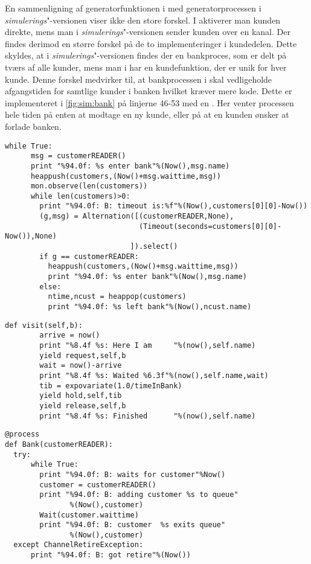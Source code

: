 En sammenligning af generatorfunktionen i \simpy med generatorprocessen i \emph{simulerings}"-versionen viser ikke den store forskel. I \simpy aktiverer man kunden direkte, mens man i \emph{simulerings}"-versionen sender kunden over en kanal. Der findes derimod en større forskel på de to implementeringer i kundedelen. Dette skyldes, at i \emph{simulerings}"-versionen findes der en bankproces, som er delt på tværs af alle kunder, mens man i \simpy har en kundefunktion, der er unik for hver kunde. Denne forskel medvirker til, at bankprocessen i \simpy skal vedligeholde afgangstiden for samtlige kunder i banken  hvilket kræver mere kode. Dette er implementeret i  \cref{fig:sim:bank} på linjerne 46-53 med en . Her venter processen hele tiden på enten at modtage en ny kunde, eller på at en kunden ønsker at forlade banken.
\begin{lstlisting}[firstnumber=39,float=hbtp, label=fig:sim:bank, caption= Uddrag af bank processen i simulation]
    while True:
      msg = customerREADER()
      print "%94.0f: %s enter bank"%(Now(),msg.name)
      heappush(customers,(Now()+msg.waittime,msg))
      mon.observe(len(customers))
      while len(customers)>0:
        print "%94.0f: B: timeout is:%f"%(Now(),customers[0][0]-Now())
        (g,msg) = Alternation([(customerREADER,None),
                               (Timeout(seconds=customers[0][0]- Now()),None)
                             ]).select()
        if g == customerREADER:
          heappush(customers,(Now()+msg.waittime,msg))
          print "%94.0f: %s enter bank"%(Now(),msg.name)
        else:
          ntime,ncust = heappop(customers)
          print "%94.0f: %s left bank"%(Now(),ncust.name) 
\end{lstlisting}
\begin{lstlisting}[firstnumber=20 ,float=hbtp, label=fig:simpy:customer, caption=Funktionen \code{visit} i \simpy]
     def visit(self,b):                                
        arrive = now()
        print "%8.4f %s: Here I am     "%(now(),self.name)
        yield request,self,b                          
        wait = now()-arrive
        print "%8.4f %s: Waited %6.3f"%(now(),self.name,wait)
        tib = expovariate(1.0/timeInBank)            
        yield hold,self,tib                          
        yield release,self,b                         
        print "%8.4f %s: Finished      "%(now(),self.name)
\end{lstlisting}
\begin{lstlisting}[firstnumber=33 ,float=hbtp, label=fig:sim:bank2, caption=Bankprocessen\, hvor banken er en begrænset ressource. ]
  @process
def Bank(customerREADER):
  try:
      while True:
        print "%94.0f: B: waits for customer"%Now()
        customer = customerREADER()
        print "%94.0f: B: adding customer %s to queue"
               %(Now(),customer)
        Wait(customer.waittime)
        print "%94.0f: B: customer  %s exits queue"
               %(Now(),customer)
  except ChannelRetireException:
      print "%94.0f: B: got retire"%(Now())

\end{lstlisting}
